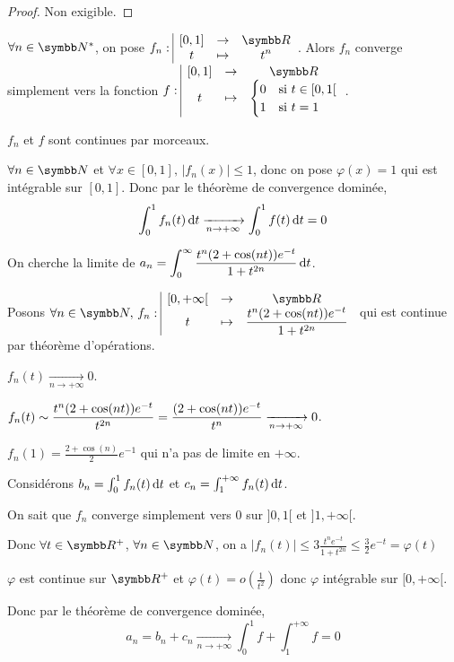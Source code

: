 \begin{proof}
    Non exigible. 
\end{proof}

\begin{exemple}
    $\forall n \in \N^*$, on pose $\fonction {f_n}{[0, 1]}{\R}{t}{t^n}$. 
    Alors $f_n$ converge simplement vers la fonction $\fonction f {[0, 1]}{\R}{t}{\begin{cases}
        0 & \text{si } t \in [0, 1[ \\
        1 & \text{si } t = 1
    \end{cases}}$.

    \svspace $f_n$ et $f$ sont continues par morceaux. 

    $\forall n \in \N$ et $\forall x \in [0, 1], \, |f_n(x)| \leqslant 1$, donc on pose 
    $\varphi(x) = 1$ qui est intégrable sur $[0, 1]$. Donc par le théorème de convergence 
    dominée, $$\int_0^1 f_n(t) \,\mathrm{d}t \xrightarrow[n \to + \infty]{} \int_0^1 f(t) \,\mathrm{d}t = 0$$
\end{exemple}

\begin{exemple}
    On cherche la limite de $\displaystyle a_n = \int_{0 }^{ \infty } \frac{t^n(2 + \cos (nt)) e^{-t}}{1 + t^{2n}} \,\mathrm{d}t$.

    \svspace Posons $\forall n \in \N, \, \fonction {f_n}{[0, + \infty[}{\R}{t}{\frac{t^n(2 + \cos (nt)) e^{-t}}{1 + t^{2n}}}$ qui
    est continue par théorème d'opérations.


    \avspace $f_n(t) \xrightarrow[n \to + \infty]{} 0$.


    \avspace $\displaystyle f_n(t) \sim \frac{t^n(2 + \cos(nt))e^{-t}}{t^{2n}} = \frac{(2 + \cos(nt))e^{-t}}{t^n} \xrightarrow[n \to + \infty]{} 0$.

    $f_n(1) = \frac{2 + \cos(n)}{2}e^{-1}$ qui n'a pas de limite en $+\infty$. 

    Considérons $b_n = \int_0^1 f_n(t) \,\mathrm{d}t$ et $c_n = \int_1^{+ \infty} f_n(t) \,\mathrm{d}t$.

    On sait que $f_n$ converge simplement vers $0$ sur $]0, 1[$ et $]1, + \infty[$.

    Donc $\forall t \in \R^+$, $\forall n \in \N$, on a $|f_n(t)| \leqslant 3 \frac{t^n e^{-t}}{1 + t^{2n}} \leqslant \frac 3 2 e^{-t} = \varphi(t)$

    $\varphi$ est continue sur $\R^+$ et $\varphi(t) = o\left( \frac 1 {t^2} \right)$ donc $\varphi$ 
    intégrable sur $[0, + \infty[$.

    Donc par le théorème de convergence dominée, $$a_n = b_n + c_n \xrightarrow[n \to + \infty]{} \int_{0}^{1} f + \int_1^{+ \infty} f = 0$$
\end{exemple}

